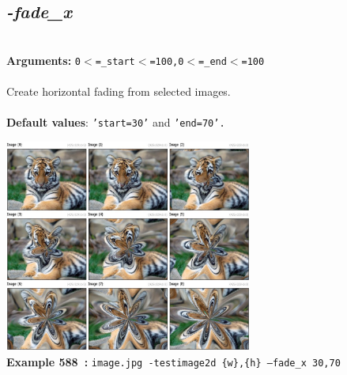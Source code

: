 \documentclass[a4paper,11pt,twoside]{book}
\begin{document}
\subsection{\emph{-fade\_x} }\vspace*{-0.5em}
~\\\textbf{Arguments: } 
{\small \texttt{0$<$=\_start$<$=100,0$<$=\_end$<$=100}}\\~\\
Create horizontal fading from selected images.
~\\~\\\textbf{Default values}: {\small \texttt{'start=30'} and \texttt{'end=70'.}}
\begin{center}\includegraphics[keepaspectratio=true,height=7cm,width=\textwidth]{img/gmic_def588.jpg}\\
{\footnotesize \textbf{Example 588~:} \texttt{image.jpg -testimage2d \{w\},\{h\} --fade\_x 30,70}}
\end{center}
\end{document}
